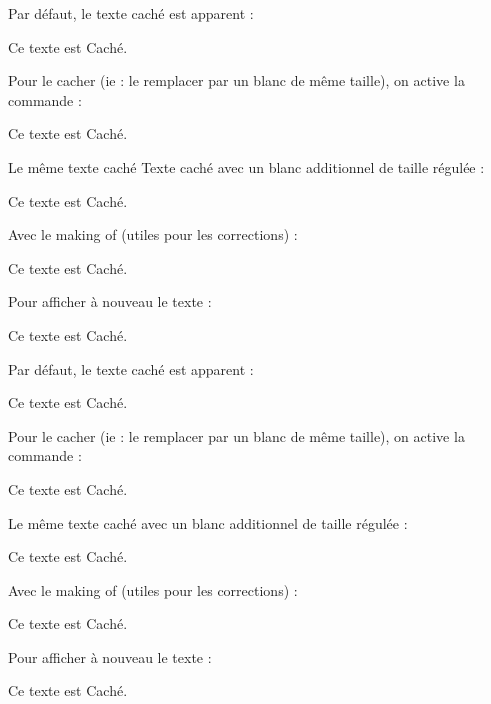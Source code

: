 \documentclass[a4paper,12pt]{article}
\begin{document}
\begin{code}%
Par défaut, le texte caché est apparent :
\begin{texteCache}
	Ce texte est Caché.\\
\end{texteCache}
Pour le cacher (ie : le remplacer par un blanc de même taille),
 on active la commande :
\setTexteATrouOn
\begin{texteCache}
	Ce texte est Caché.\\
\end{texteCache}
Le même texte caché Texte caché avec un blanc additionnel de taille régulée :
\setTexteATrouOn
\begin{texteCache}[3cm]
	Ce texte est Caché.\\
\end{texteCache}
Avec le making of (utiles pour les corrections) :
\setMakingOfOn
\begin{texteCache}
	Ce texte est Caché.\\
\end{texteCache}
Pour afficher à nouveau le texte :
\setTexteATrouOff
\begin{texteCache}
	Ce texte est Caché.\\
\end{texteCache}
\end{code}

Par défaut, le texte caché est apparent :
\begin{texteCache}
	Ce texte est Caché.\\
\end{texteCache}
Pour le cacher (ie : le remplacer par un blanc de même taille), on active la commande :
\setTexteATrouOn
\begin{texteCache}
	Ce texte est Caché.\\
\end{texteCache}
Le même texte caché avec un blanc additionnel de taille régulée :
\setTexteATrouOn
\begin{texteCache}[3cm]
	Ce texte est Caché.\\
\end{texteCache}
Avec le making of (utiles pour les corrections) :
\setMakingOfOn
\begin{texteCache}
	Ce texte est Caché.\\
\end{texteCache}
Pour afficher à nouveau le texte :
\setTexteATrouOff
\begin{texteCache}
	Ce texte est Caché.\\
\end{texteCache}
\end{document}
